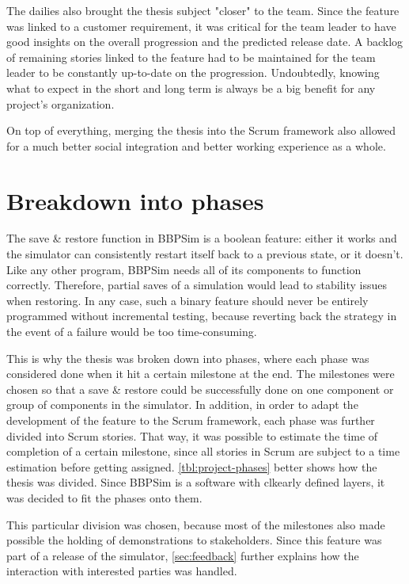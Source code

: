 {The dailies also brought the thesis subject "closer" to the team. Since the feature was linked to a customer requirement, it was critical for the team leader to have good insights on the overall progression and the predicted release date. A backlog of remaining stories linked to the feature had to be maintained for the team leader to be constantly up-to-date on the progression. Undoubtedly, knowing what to expect in the short and long term is always be a big benefit for any project's organization. 

On top of everything, merging the thesis into the Scrum framework also allowed for a much better social integration and better working experience as a whole. 

\section{Breakdown into phases}
The save \& restore function in \gls{BBPSim} is a boolean feature: either it works and the simulator can consistently restart itself back to a previous state, or it doesn't. Like any other program, \gls{BBPSim} needs all of its components to function correctly. Therefore, partial saves of a simulation would lead to stability issues when restoring. 
In any case, such a binary feature should never be entirely programmed without incremental testing, because reverting back the strategy in the event of a failure would be too time-consuming.

This is why the thesis was broken down into phases, where each phase was considered done when it hit a certain milestone at the end. The milestones were chosen so that a save \& restore could be successfully done on one component or group of components in the simulator. In addition, in order to adapt the development of the feature to the Scrum framework, each phase was further divided into Scrum stories. That way, it was possible to estimate the time of completion of a certain milestone, since all stories in Scrum are subject to a time estimation before getting assigned. \autoref{tbl:project-phases} better shows how the thesis was divided. Since \gls{BBPSim} is a software with clkearly defined layers, it was decided to fit the phases onto them.

This particular division was chosen, because most of the milestones also made possible the holding of demonstrations to stakeholders. Since this feature was part of a release of the simulator, \autoref{sec:feedback} further explains how the interaction with interested parties was handled.

}
